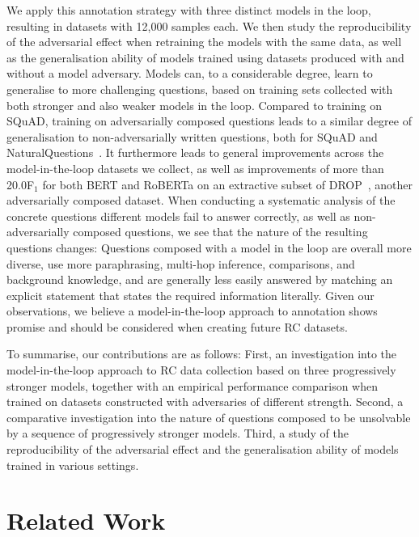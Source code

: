 \documentclass[11pt,a4paper]{article}
\newcommand{\squad}{SQuAD}
\newcommand{\drop}{DROP}
\newcommand{\naturalquestions}{NaturalQuestions}
\begin{document}
We apply this annotation strategy with three distinct models in the loop, resulting in datasets with 12,000 samples each.
We then study the reproducibility of the adversarial effect when retraining the models with the same data, as well as the generalisation ability of models trained using datasets produced with and without a model adversary.
Models can, to a considerable degree, learn to generalise to more challenging questions, based on training sets collected with both stronger and also weaker models in the loop.
Compared to training on \squad{}, training on adversarially composed questions leads to a similar degree of generalisation to non-adversarially written questions, both for \squad{} and \naturalquestions{}~\cite{kwiatkowski-etal-2019-natural}.
It furthermore leads to general improvements across the model-in-the-loop datasets we collect, as well as improvements of more than 20.0F$_\text{1}$ for both BERT and RoBERTa on an extractive subset of \drop{}~\cite{dua2019drop}, another adversarially composed dataset.
When conducting a systematic analysis of the concrete questions different models fail to answer correctly, as well as non-adversarially composed questions, we see that the nature of the resulting questions changes:
Questions composed with a model in the loop are overall more diverse, use more paraphrasing, multi-hop inference, comparisons, and background knowledge, and are generally less easily answered by matching an explicit statement that states the required information literally.
Given our observations, we believe a model-in-the-loop approach to annotation shows promise and should be considered when creating future RC datasets.


To summarise, our contributions are as follows:
First, an investigation into the model-in-the-loop approach to RC data collection based on three progressively stronger models, together with an empirical performance comparison when trained on datasets constructed with adversaries of different strength.
Second, a comparative investigation into the nature of questions composed to be unsolvable by a sequence of progressively stronger models.
Third, a study of the reproducibility of the adversarial effect and the generalisation ability of models trained in various settings.

\section{Related Work}
\end{document}
